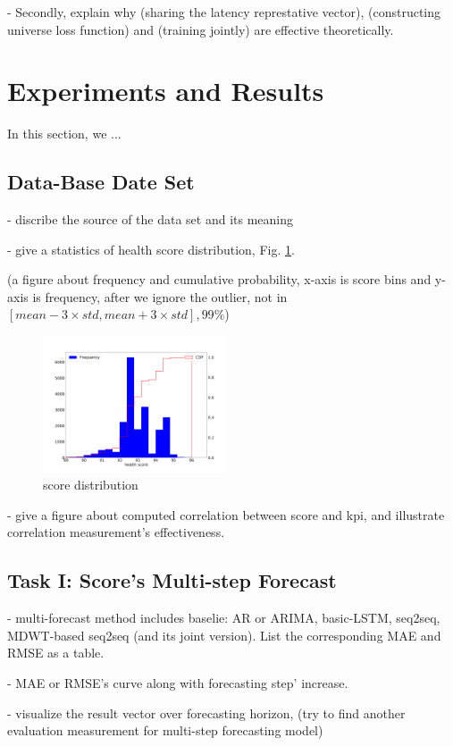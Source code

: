\documentclass{sigkddExp}
\begin{document}
  - Secondly, explain why (sharing the latency represtative vector), (constructing universe loss function) and (training jointly) are effective theoretically.

\section{Experiments and Results}
In this section, we ...

\subsection{Data-Base Date Set}
  - discribe the source of the data set and its meaning

  - give a statistics of health score distribution, Fig. \ref{score distribution}.

  (a figure about frequency and cumulative probability, x-axis is score bins and y-axis is frequency, after we ignore the outlier, not in $[mean-3 \times std, mean+3 \times std], 99\%$)
\begin{figure}
  \includegraphics[width=0.48\textwidth]{Figures/showScoreDis.png}
  \caption{score distribution}
  \label{score distribution}
\end{figure}

  - give a figure about computed correlation between score and kpi, and illustrate correlation measurement's effectiveness.

\subsection{Task I: Score's Multi-step Forecast}

  - multi-forecast method includes baselie: AR or ARIMA, basic-LSTM, seq2seq, MDWT-based seq2seq (and its joint version). List the corresponding MAE and RMSE as a table.

  - MAE or RMSE's curve along with forecasting step' increase.

  - visualize the result vector over forecasting horizon, (try to find another evaluation measurement for multi-step forecasting model)
\end{document}
